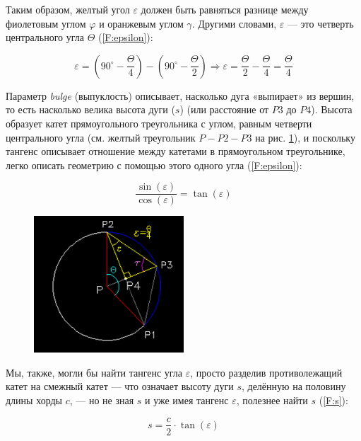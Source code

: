 Таким образом, желтый угол $\varepsilon$ должен быть равняться разнице между фиолетовым углом $\varphi$ и оранжевым углом $\gamma$. Другими словами, $\varepsilon$ --- это четверть центрального угла $\Theta$ (\ref{F:epsilon}):

\begin{equation}
	\varepsilon=(90^{\circ}-\frac{\Theta}{4})-(90^{\circ}-\frac{\Theta}{2})\Rightarrow\varepsilon=\frac{\Theta}{2}-\frac{\Theta}{4}=\frac{\Theta}{4}
	\label{F:epsilon}
\end{equation}

Параметр \textit{bulge} (выпуклость) описывает, насколько дуга «выпирает» из вершин, то есть насколько велика высота дуги ($s$) (или расстояние от $P3$ до $P4$). Высота образует катет прямоугольного треугольника с углом, равным четверти центрального угла (см. желтый треугольник $P-P2-P3$ на рис. \ref{fig:epsilon}), и поскольку тангенс описывает отношение между катетами в прямоугольном треугольнике, легко описать геометрию с помощью этого одного угла (\ref{F:epsilon}):

\begin{equation}
	\frac{\sin(\varepsilon)}{\cos(\varepsilon)}=\tan(\varepsilon)
	\label{F:epsilon}
\end{equation}

\begin{figure}[H]
	\centering
	\includegraphics[width=0.5\textwidth]{figures/epsilon.png}
	\label{fig:epsilon}
\end{figure}

Мы, также, могли бы найти тангенс угла $\varepsilon$, просто разделив противолежащий катет на смежный катет --- что означает высоту дуги $s$, делённую на половину длины хорды $c$, --- но не зная $s$ и уже имея тангенс $\varepsilon$, полезнее найти $s$ (\ref{F:s}):

\begin{equation}
	s=\frac{c}{2}\cdot\tan(\varepsilon)
	\label{F:s}
\end{equation}

